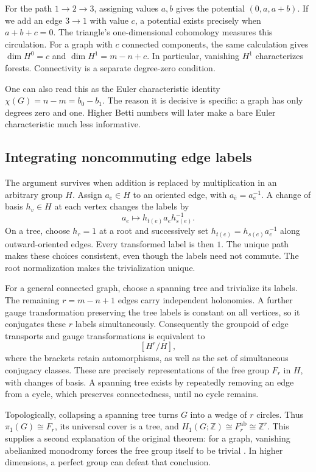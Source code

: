\documentclass[11pt]{article}
\theoremstyle{definition}
\theoremstyle{remark}
\newcommand{\Z}{\mathbb Z}
\begin{document}
For the path \(1\to2\to3\), assigning values \(a,b\) gives the potential \((0,a,a+b)\). If we add an edge \(3\to1\) with value \(c\), a potential exists precisely when \(a+b+c=0\). The triangle's one-dimensional cohomology measures this circulation. For a graph with \(c\) connected components, the same calculation gives \(\dim H^0=c\) and \(\dim H^1=m-n+c\). In particular, vanishing \(H^1\) characterizes forests. Connectivity is a separate degree-zero condition.

One can also read this as the Euler characteristic identity \(\chi(G)=n-m=b_0-b_1\). The reason it is decisive is specific: a graph has only degrees zero and one. Higher Betti numbers will later make a bare Euler characteristic much less informative.

\subsection{Integrating noncommuting edge labels}

The argument survives when addition is replaced by multiplication in an arbitrary group \(H\). Assign \(a_e\in H\) to an oriented edge, with \(a_{\bar e}=a_e^{-1}\). A change of basis \(h_v\in H\) at each vertex changes the labels by
\[
 a_e\longmapsto h_{t(e)}a_eh_{s(e)}^{-1}.
\]
On a tree, choose \(h_r=1\) at a root and successively set
\(h_{t(e)}=h_{s(e)}a_e^{-1}\) along outward-oriented edges. Every transformed label is then \(1\). The unique path makes these choices consistent, even though the labels need not commute. The root normalization makes the trivialization unique.

For a general connected graph, choose a spanning tree and trivialize its labels. The remaining \(r=m-n+1\) edges carry independent holonomies. A further gauge transformation preserving the tree labels is constant on all vertices, so it conjugates these \(r\) labels simultaneously. Consequently the groupoid of edge transports and gauge transformations is equivalent to
\[
 [H^r/H],
\]
where the brackets retain automorphisms, as well as the set of simultaneous conjugacy classes. These are precisely representations of the free group \(F_r\) in \(H\), with changes of basis. A spanning tree exists by repeatedly removing an edge from a cycle, which preserves connectedness, until no cycle remains.

Topologically, collapsing a spanning tree turns \(G\) into a wedge of \(r\) circles. Thus \(\pi_1(G)\cong F_r\), its universal cover is a tree, and
\(H_1(G;\Z)\cong F_r^{\mathrm{ab}}\cong\Z^r\). This supplies a second explanation of the original theorem: for a graph, vanishing abelianized monodromy forces the free group itself to be trivial \cite{rootHatcher}. In higher dimensions, a perfect group can defeat that conclusion.
\end{document}
